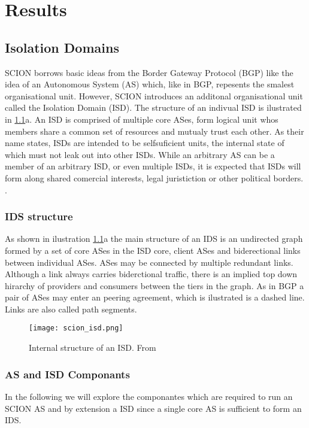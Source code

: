 \documentclass[../eva1_scion.tex]{subfiles}
\begin{document}
    \chapter{Results}
    \section{Isolation Domains}
    SCION borrows basic ideas from the Border Gateway Protocol (BGP) like the idea of an Autonomous System (AS) which, like in BGP, repesents the smalest organisational unit. However, SCION introduces an additonal organisational unit called the Isolation Domain (ISD). The structure of an indivual ISD is ilustrated in \ref{fig:isd}a. An ISD is comprised of multiple core ASes, form logical unit whos members share a common set of resources and mutualy trust each other. As their name states, ISDs are intended to be selfsuficient units, the internal state of which must not leak out into other ISDs. \cite{scion_2011} While an arbitrary AS can be a member of an arbitrary ISD, or even multiple ISDs, it is expected that ISDs will form along shared comercial interests, legal juristiction or other political borders. \cite{scion_2017}.

    \subsection{IDS structure}
    As shown in ilustration \ref{fig:isd}a the main structure of an IDS is an undirected graph formed by a set of core ASes in the ISD core, client ASes and biderectional links between individual ASes. ASes may be connected by multiple redundant links. Although a link always carries biderctional traffic, there is an implied top down hirarchy of providers and consumers between the tiers in the graph. As in BGP a pair of ASes may enter an peering agreement, which is ilustrated is a dashed line. Links are also called path segments.

    \begin{figure}[ht]
        \centering
        \texttt{[image: scion\_isd.png]}
        \caption{Internal structure of an ISD. From \cite{scion_2017}}%
        \label{fig:isd}
    \end{figure}

    \subsection{AS and ISD Componants}
    In the following we will explore the componantes which are required to run an SCION AS and by extension a ISD since a single core AS is sufficient to form an IDS.
\end{document}
